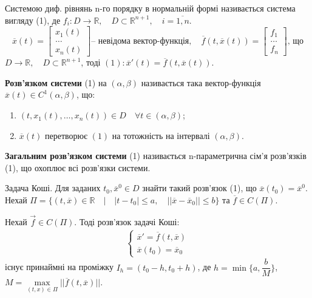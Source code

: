 \documentclass[14pt,a4paper]{scrartcl}
\theoremstyle{definition}
\theoremstyle{remark}
\theoremstyle{definition}
\theoremstyle{definition}
\begin{document}
 Системою диф. рівнянь n-го порядку в нормальній формі називається система вигляду (1), де $ f_i : D \to \mathbb{R}, \quad D \subset \mathbb{R}^{n+1 }, \quad i = \overline{1, n}$.
\look
\[
      \overline{x}(t) = \left[\begin{array}{l}
      x_1(t)    \\
      \dots     \\
      x_n(t)
      \end{array}\right] \text{-- невідома вектор-функція}, \quad
      \overline{f}(t, \overline{x}(t)) = \left[\begin{array}{l}
      f_1     \\
      \dots  \\
      f_n
      \end{array}\right] \text{, що}
\]
$D \rightarrow \mathbb{R}, \quad D \subset \mathbb{R}^{n+1}$, тоді $(1): \overline{x}'(t) = \overline{f}(t, \overline{x}(t))$.


\def\rect{\textbf{П}}
\bd
\textbf{Розв'язком системи} (1) на $(\alpha , \beta)$ називається така вектор-функція $\overline{x} (t) \in C^1(\alpha , \beta)$, що:
\begin{enumerate}
  \item $(t, x_1(t), \dots, x_n(t)) \in D \quad \forall t \in (\alpha, \beta)$;
  \item $\overline{x}(t)$  перетворює $(1)$ на тотожність на інтервалі $(\alpha, \beta)$.
\end{enumerate}

\textbf{Загальним розв'язком системи}  (1) називається n-параметрична сім'я розв'язків (1), що охоплює всі розв'язки системи.
\ed

Задача Коші. Для заданих $t_0, \overline{x}^{0} \in D$ знайти такий розв'язок (1), що $\overline{x} (t_0) = \overline{x}^{0}$.
Нехай $\Pi = \{(t, \overline{x}) \in \mathbb{R} \quad \big| \quad |t-t_0| \leq a, \quad ||\overline{x} - \overline{x}_0|| \leq b \}$ та $\overline{f} \in C(\Pi)$.

\begin{boxteo}
Нехай $\vec{f} \in C(\Pi)$. Тоді розв'язок задачі Коші:
\begin{gather*}
  \begin{cases}
    \overline{x}' = \overline{f}(t, \overline{x}) \\
    \overline{x}(t_0) = \overline{x}_0
  \end{cases}
\end{gather*}
існує принаймні на проміжку $I_h = (t_0 - h, t_0 + h)$, де $h = \min\{{a, \dfrac{b}{M}}\}$, \\ $M = \max\limits_{(t, x) \in \Pi} {||\overline{f}(t, \overline{x})||}$.
\end{boxteo}
\end{document}
